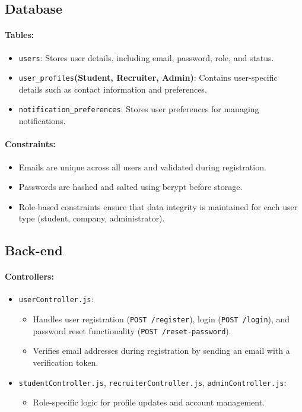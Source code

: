 \subsection*{Database}
\paragraph{Tables:}
\begin{itemize}
    \item \texttt{users}: Stores user details, including email, password, role, and status.
    \item \texttt{user\_profiles}\textbf{(Student, Recruiter, Admin)}: Contains user-specific details such as contact information and preferences.
    \item \texttt{notification\_preferences}: Stores user preferences for managing notifications.
\end{itemize}

\paragraph{Constraints:}
\begin{itemize}
    \item Emails are unique across all users and validated during registration.
    \item Passwords are hashed and salted using bcrypt before storage.
    \item Role-based constraints ensure that data integrity is maintained for each user type (student, company, administrator).
\end{itemize}

\subsection*{Back-end}
\paragraph{Controllers:}
\begin{itemize}
    \item \texttt{userController.js}:
    \begin{itemize}
        \item Handles user registration (\texttt{POST /register}), login (\texttt{POST /login}), and password reset functionality (\texttt{POST /reset-password}).
        \item Verifies email addresses during registration by sending an email with a verification token.
    \end{itemize}
    \item \texttt{studentController.js}, \texttt{recruiterController.js}, \texttt{adminController.js}:
    \begin{itemize}
        \item Role-specific logic for profile updates and account management.
    \end{itemize}
\end{itemize}

